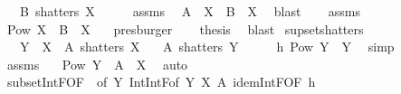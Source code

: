 \begin{isabellebody}
\ \ \ {\isachardoublequoteopen}B\ shatters\ X{\isachardoublequoteclose}\isanewline
%
\isadelimproof
%
\endisadelimproof
%
\isatagproof
{}\isamarkupfalse%
\ {\isacharminus}{\kern0pt}\isanewline
\ \ \isamarkupfalse%
\ assms{\isacharparenleft}{\kern0pt}{}{\isacharparenright}{\kern0pt}\ \isamarkupfalse%
\ {\isachardoublequoteopen}A\ {\isasyminter}{\isacharasterisk}{\kern0pt}\ X\ {\isasymsubseteq}\ B\ {\isasyminter}{\isacharasterisk}{\kern0pt}\ X{\isachardoublequoteclose}\ \isamarkupfalse%
\ blast\isanewline
\ \ \isamarkupfalse%
\ assms{\isacharparenleft}{\kern0pt}{}{\isacharparenright}{\kern0pt}\ \isamarkupfalse%
\ {\isachardoublequoteopen}Pow\ X\ {\isasymsubseteq}\ B\ {\isasyminter}{\isacharasterisk}{\kern0pt}\ X{\isachardoublequoteclose}\ \ \isamarkupfalse%
\ presburger\isanewline
\ \ \isamarkupfalse%
\ {\isacharquery}{\kern0pt}thesis\ \isamarkupfalse%
\ blast\isanewline
{}\isamarkupfalse%
%
\endisatagproof
{\isafoldproof}%
%
\isadelimproof
\isanewline
%
\endisadelimproof
\isanewline
{}\isamarkupfalse%
\ supset{\isacharunderscore}{\kern0pt}shatters{\isacharcolon}{\kern0pt}\isanewline
\ \ \ {\isachardoublequoteopen}Y\ {\isasymsubseteq}\ X{\isachardoublequoteclose}\ \ {\isachardoublequoteopen}A\ shatters\ X{\isachardoublequoteclose}\isanewline
\ \ \ {\isachardoublequoteopen}A\ shatters\ Y{\isachardoublequoteclose}\isanewline
%
\isadelimproof
%
\endisadelimproof
%
\isatagproof
{}\isamarkupfalse%
\ {\isacharminus}{\kern0pt}\isanewline
\ \ \isamarkupfalse%
\ h{\isacharcolon}{\kern0pt}\ {\isachardoublequoteopen}{\isasymUnion}{\isacharparenleft}{\kern0pt}Pow\ Y{\isacharparenright}{\kern0pt}\ {\isasymsubseteq}\ Y{\isachardoublequoteclose}\ \isamarkupfalse%
\ simp\isanewline
\ \ \isamarkupfalse%
\ assms\ \isamarkupfalse%
\ {}{\isacharcolon}{\kern0pt}\ {\isachardoublequoteopen}Pow\ Y\ {\isasymsubseteq}\ A\ {\isasyminter}{\isacharasterisk}{\kern0pt}\ X{\isachardoublequoteclose}\ \isamarkupfalse%
\ auto\isanewline
\ \ \isamarkupfalse%
\ subset{\isacharunderscore}{\kern0pt}IntF{\isacharbrackleft}{\kern0pt}OF\ {}{\isacharcomma}{\kern0pt}\ of\ Y{\isacharbrackright}{\kern0pt}\ Int{\isacharunderscore}{\kern0pt}IntF{\isacharbrackleft}{\kern0pt}of\ Y\ X\ A{\isacharbrackright}{\kern0pt}\ idem{\isacharunderscore}{\kern0pt}IntF{\isacharbrackleft}{\kern0pt}OF\ h{\isacharbrackright}{\kern0pt}\ \isamarkupfalse%

\end{isabellebody}
